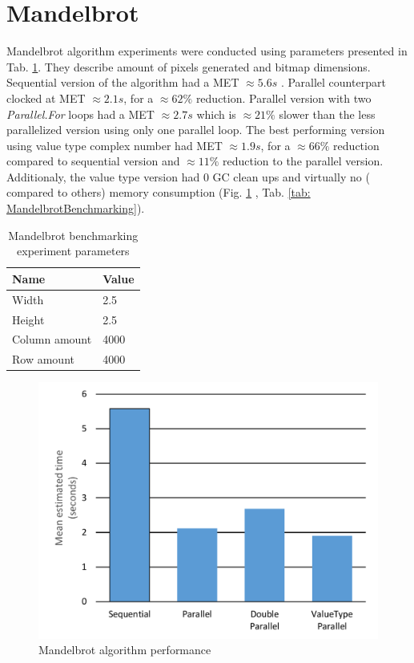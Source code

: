 \clearpage
\section{Mandelbrot}
Mandelbrot algorithm experiments were conducted using parameters presented in 
Tab. \ref{tab: MandelbrotParameters}. They describe amount of pixels 
generated and bitmap dimensions.
Sequential version of the algorithm had a MET  $\approx 5.6s$ . Parallel 
counterpart clocked at MET  $\approx 2.1s$, for a $\approx 62\%$ reduction. 
Parallel version with two \emph{Parallel.For} loops had a MET $\approx 2.7s$ 
which is $\approx 21\%$ slower than the less parallelized version using only 
one parallel loop. The best performing version using value type complex 
number had MET $\approx 1.9s$, for a $\approx 66\%$  reduction compared to 
sequential version and $\approx 11\%$  reduction to the parallel version. 
Additionaly, the value type version had 0 GC clean ups and virtually no (
compared to others) memory consumption (Fig. \ref{fig: MandelbrotPerformance}
, Tab. \ref{tab: MandelbrotBenchmarking}).

\begin{table}[!ht]
    \centering
    \caption{Mandelbrot benchmarking experiment parameters}
		\label{tab: MandelbrotParameters}
    \begin{tabular}{p{3cm}p{3cm}}
			\toprule
			\bfseries Name 	&
			\bfseries Value \\
			\midrule
			Width & 2.5 \\
			Height & 2.5 \\
			Column amount & 4000 \\ 
			Row amount  & 4000 \\	
			\bottomrule
    \end{tabular}
\end{table}

\begin{figure}[htb]
\centering
\includegraphics[width=.8\linewidth]{figures04/Mandelbrot.pdf}
\caption{Mandelbrot algorithm performance}
\label{fig: MandelbrotPerformance}
\end{figure}

